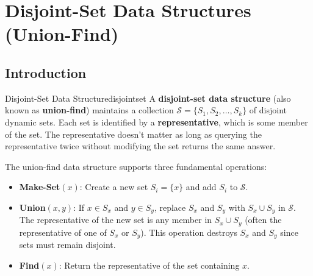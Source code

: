 
\section*{Disjoint-Set Data Structures (Union-Find)}

\subsection{Introduction}

\begin{definition}{Disjoint-Set Data Structure}{disjointset}
A \textbf{disjoint-set data structure} (also known as \textbf{union-find}) maintains a collection 
$\mathcal{S} = \{S_1, S_2, \ldots, S_k\}$ of disjoint dynamic sets. Each set is identified by 
a \textbf{representative}, which is some member of the set. The representative doesn't matter 
as long as querying the representative twice without modifying the set returns the same answer.
\end{definition}

The union-find data structure supports three fundamental operations:

\begin{itemize}[noitemsep]
  \item \textbf{Make-Set}$(x)$: Create a new set $S_i = \{x\}$ and add $S_i$ to $\mathcal{S}$.
  \item \textbf{Union}$(x, y)$: If $x \in S_x$ and $y \in S_y$, replace $S_x$ and $S_y$ with 
        $S_x \cup S_y$ in $\mathcal{S}$. The representative of the new set is any member in 
        $S_x \cup S_y$ (often the representative of one of $S_x$ or $S_y$). This operation 
        destroys $S_x$ and $S_y$ since sets must remain disjoint.
  \item \textbf{Find}$(x)$: Return the representative of the set containing $x$.
\end{itemize}

